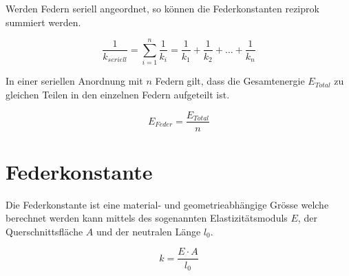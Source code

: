 \noindent
Werden Federn seriell angeordnet, so können die Federkonstanten reziprok 
summiert werden.

\[ \boxed{\frac{1}{k_{seriell}} = \sum_{i=1}^n \frac{1}{k_i} = 
	\frac{1}{k_1} + \frac{1}{k_2} + \dots + \frac{1}{k_n}} \]

\noindent
In einer seriellen Anordnung mit $n$ Federn gilt, dass die Gesamtenergie 
$E_{Total}$ zu gleichen Teilen in den einzelnen Federn aufgeteilt ist.

\[ \boxed{E_{Feder} = \frac{E_{Total}}{n}} \]

\section{Federkonstante}
Die Federkonstante ist eine material- und geometrieabhängige Grösse welche
berechnet werden kann mittels des sogenannten Elastizitätsmoduls $E$, der
Querschnittsfläche $A$ und der neutralen Länge $l_0$.

\[ \boxed{k = \frac{E \cdot A}{l_0}} \]

